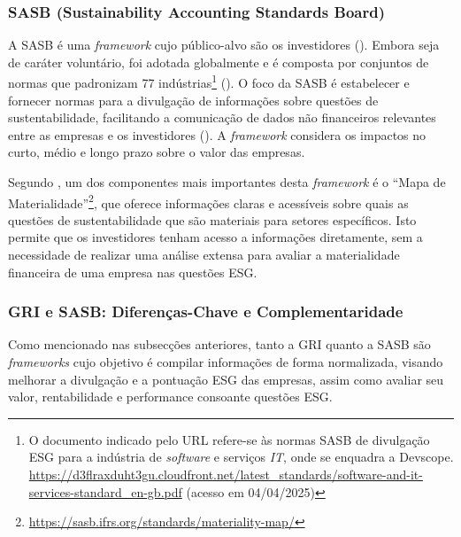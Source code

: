 
\subsubsection{SASB (Sustainability Accounting Standards Board)}
\label{subsubsec: SASB}

A \gls{SASB} é uma \textit{framework} cujo público-alvo são os investidores (\cite{GRISASB2021}). Embora seja de caráter voluntário, foi adotada globalmente e é composta por conjuntos de normas que padronizam 77 indústrias\footnote{O documento indicado pelo URL refere-se às normas SASB de divulgação \gls{ESG} para a indústria de \textit{software} e serviços \textit{\gls{IT}}, onde se enquadra a Devscope. \url{https://d3flraxduht3gu.cloudfront.net/latest_standards/software-and-it-services-standard_en-gb.pdf} (acesso em 04/04/2025)} (\cite{SASB2025}). O foco da SASB é estabelecer e fornecer normas para a divulgação de informações sobre questões de sustentabilidade, facilitando a comunicação de dados não financeiros relevantes entre as empresas e os investidores (\cite{Goswami2023}). A \textit{framework} considera os impactos no curto, médio e longo prazo sobre o valor das empresas.

Segundo \cite{Cruz2023}, um dos componentes mais importantes desta \textit{framework} é o “Mapa de Materialidade”\footnote{\url{https://sasb.ifrs.org/standards/materiality-map/}}, que oferece informações claras e acessíveis sobre quais as questões de sustentabilidade que são materiais para setores específicos. Isto permite que os investidores tenham acesso a informações diretamente, sem a necessidade de realizar uma análise extensa para avaliar a materialidade financeira de uma empresa nas questões \gls{ESG}.


\subsubsection{GRI e SASB: Diferenças-Chave e Complementaridade}
\label{subsubsec: GRI_E_SASB}

Como mencionado nas subsecções anteriores, tanto a \gls{GRI} quanto a \gls{SASB} são \textit{frameworks} cujo objetivo é compilar informações de forma normalizada, visando melhorar a divulgação e a pontuação \gls{ESG} das empresas, assim como avaliar seu valor, rentabilidade e performance consoante questões \gls{ESG}.

